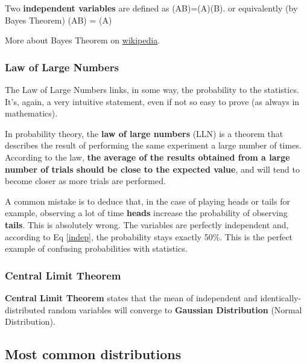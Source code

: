 Two \textbf{independent variables} are defined as
\be
{}(A\cap B)={}(A)(B).
\ee
or equivalently (by Bayes Theorem)
\be
\label{indep}
{}(A\mid B) =  {}(A)
\ee

More about Bayes Theorem on \href{https://en.wikipedia.org/wiki/Random_variable}{wikipedia}.

\subsubsection{Law of Large Numbers}

The Law of Large Numbers links, in some way, the probability to the statistics. It's, again, a very intuitive statement, even if not so easy to prove (as always in mathematics).

\begin{framed}
In probability theory, the\textbf{ law of large numbers} (LLN) is a theorem that describes the result of performing the same experiment a large number of times. According to the law, \textbf{the average of the results obtained from a large number of trials should be close to the expected value}, and will tend to become closer as more trials are performed.
\end{framed}

A common mistake is to deduce that, in the case of playing heads or tails for example, observing a lot of time \textbf{heads} increase the probability of observing \textbf{tails}. This is absolutely wrong. The variables are perfectly independent and, according to Eq \ref{indep}, the probability stays exactly 50\%. This is the perfect example of confusing probabilities with statistics.

\subsubsection{Central Limit Theorem}

\textbf{Central Limit Theorem} states that the mean of independent and identically-distributed random variables will converge to \textbf{Gaussian Distribution} (Normal Distribution).

\subsection{Most common distributions}

